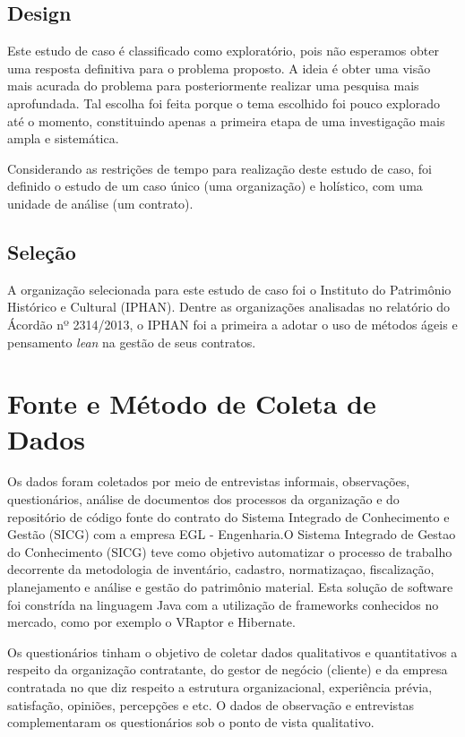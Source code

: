 \subsection[Design]{Design}

Este estudo de caso é classificado como exploratório, pois não esperamos obter uma resposta definitiva para o problema proposto. A ideia é obter uma visão mais acurada do problema para posteriormente realizar uma pesquisa mais aprofundada. Tal escolha foi feita porque o tema escolhido foi pouco explorado até o momento, constituindo apenas a primeira etapa de uma investigação mais ampla e sistemática. 

Considerando as restrições de tempo para realização deste estudo de caso, foi definido o estudo de um caso único (uma organização) e holístico, com uma unidade de análise (um contrato). 

\subsection[Seleção]{Seleção}

A organização selecionada para este estudo de caso foi o Instituto do Patrimônio Histórico e Cultural (IPHAN). Dentre as organizações analisadas no relatório do Ácordão nº 2314/2013, o IPHAN foi a primeira a adotar o uso de métodos ágeis e pensamento \textit{lean} na gestão de seus contratos. 

\section[Fonte e Método Coleta de Dados]{Fonte e Método de Coleta de Dados}

Os dados foram coletados por meio de entrevistas informais, observações, questionários, análise de documentos dos processos da organização e do repositório de código fonte do contrato do Sistema Integrado de Conhecimento e Gestão (SICG) com a empresa EGL - Engenharia.O Sistema Integrado de Gestao do Conhecimento (SICG) teve como objetivo automatizar o processo de trabalho decorrente da metodologia de inventário, cadastro, normatizaçao, fiscalização, planejamento e análise e gestão do patrimônio material. Esta solução de software foi constrída na linguagem Java com a utilização de frameworks conhecidos no mercado, como por exemplo o VRaptor e Hibernate.

Os questionários tinham o objetivo de coletar dados qualitativos e quantitativos a respeito da organização contratante, do gestor de negócio (cliente) e da empresa contratada no que diz respeito a estrutura organizacional, experiência prévia, satisfação, opiniões, percepções e etc. O dados de observação e entrevistas complementaram os questionários sob o ponto de vista qualitativo.

